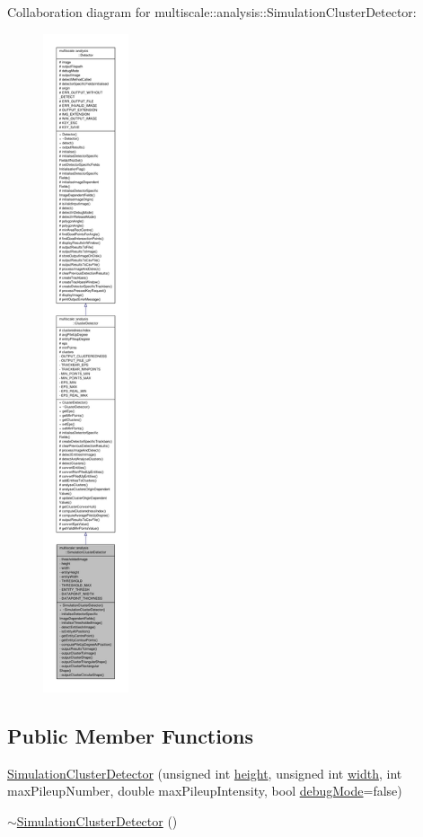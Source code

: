 Collaboration diagram for multiscale\-:\-:analysis\-:\-:Simulation\-Cluster\-Detector\-:
\nopagebreak
\begin{figure}[H]
\begin{center}
\leavevmode
\includegraphics[height=550pt]{classmultiscale_1_1analysis_1_1SimulationClusterDetector__coll__graph}
\end{center}
\end{figure}
\subsection*{Public Member Functions}
\begin{DoxyCompactItemize}
\item 
\hyperlink{classmultiscale_1_1analysis_1_1SimulationClusterDetector_a5ec24468129dfa9b6a7f38e11a78c69b}{Simulation\-Cluster\-Detector} (unsigned int \hyperlink{classmultiscale_1_1analysis_1_1SimulationClusterDetector_a9d0a0fe5d9ea0f2516d07bf44b1da257}{height}, unsigned int \hyperlink{classmultiscale_1_1analysis_1_1SimulationClusterDetector_a4c66a82aa1749dce31c767bc4008d904}{width}, int max\-Pileup\-Number, double max\-Pileup\-Intensity, bool \hyperlink{classmultiscale_1_1analysis_1_1Detector_a4b42f796957efd6ee0b8cf7645494a65}{debug\-Mode}=false)
\item 
\hyperlink{classmultiscale_1_1analysis_1_1SimulationClusterDetector_a8df6b5abd6d2dd48e691bf999d35dd43}{$\sim$\-Simulation\-Cluster\-Detector} ()
\end{DoxyCompactItemize}
